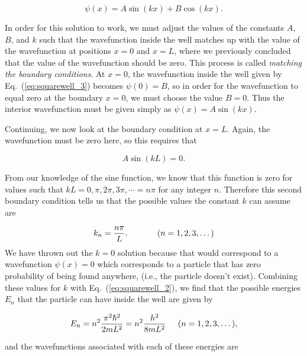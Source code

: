 \begin{equation}
\label{eq:squarewell_3}
\psi(x) = A \sin{(kx)} + B \cos{(kx)} .
\end{equation}

In order for this solution to work, we must adjust the values of the
constants $A$, $B$, and $k$ such that the wavefunction inside the well
matches up with the value of the wavefunction at positions $x = 0$ and
$x = L$, where we previously concluded that the value of the
wavefunction should be zero.  This process is called {\it matching the
 boundary conditions}.  At $x = 0$, the wavefunction inside the well given
by Eq.~(\ref{eq:squarewell_3}) becomes $\psi(0) = B$, so in order
for the wavefunction to equal zero at the boundary $x = 0$, we must
choose the value $B = 0$.  Thus the interior wavefunction must be
given simply as $\psi(x) = A \sin{(kx)}$.

Continuing, we now look at the boundary condition at $x = L$.  Again,
the wavefunction must be zero here, so this requires that

\begin{equation}
\label{eq:squarewell_4}
A \sin{(k L)} = 0.
\end{equation}

\noindent From our knowledge of the sine function, we know that this
function is zero for values such that $k L = 0, \pi, 2\pi, 3\pi,
\cdots = n \pi$ for any integer $n$.  Therefore this second boundary
condition tells us that the possible values the constant $k$ can
assume are

\begin{equation}
\label{eq:squarewell_5}
k_n = \frac{n \pi}{L} . \hspace{0.5in} (n = 1, 2, 3, \dots)
\end{equation}
We have thrown out the $k = 0$ solution because that would correspond
to a wavefunction $\psi(x) = 0$ which corresponds to a particle that has
zero probability of being found anywhere, (i.e., the particle doesn't
exist).
Combining these values for $k$ with Eq.~(\ref{eq:squarewell_2}),
we find that the possible energies $E_n$ that the particle can have
inside the well are given by

\begin{equation}
\label{eq:squarewell_6}
E_n = n^2 \frac{\pi^2 \hbar^2}{2mL^2} 
= n^2 \frac{h^2}{8 m L^2} \hspace{0.2in} (n = 1, 2, 3, \dots),
\end{equation}

\noindent and the wavefunctions associated with each of these energies are

